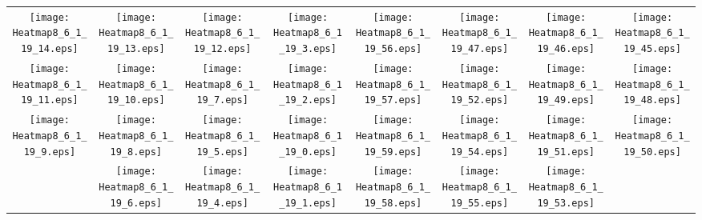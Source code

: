 \documentclass{standalone}
\begin{document}
\begin{tabular}{ *8{c} }
\texttt{[image: Heatmap8\_6\_1\_19\_14.eps]} & \texttt{[image: Heatmap8\_6\_1\_19\_13.eps]} & \texttt{[image: Heatmap8\_6\_1\_19\_12.eps]} & \texttt{[image: Heatmap8\_6\_1\_19\_3.eps]} & \texttt{[image: Heatmap8\_6\_1\_19\_56.eps]} & \texttt{[image: Heatmap8\_6\_1\_19\_47.eps]} & \texttt{[image: Heatmap8\_6\_1\_19\_46.eps]} & \texttt{[image: Heatmap8\_6\_1\_19\_45.eps]} \\
\texttt{[image: Heatmap8\_6\_1\_19\_11.eps]} & \texttt{[image: Heatmap8\_6\_1\_19\_10.eps]} & \texttt{[image: Heatmap8\_6\_1\_19\_7.eps]} & \texttt{[image: Heatmap8\_6\_1\_19\_2.eps]} & \texttt{[image: Heatmap8\_6\_1\_19\_57.eps]} & \texttt{[image: Heatmap8\_6\_1\_19\_52.eps]} & \texttt{[image: Heatmap8\_6\_1\_19\_49.eps]} & \texttt{[image: Heatmap8\_6\_1\_19\_48.eps]} \\
\texttt{[image: Heatmap8\_6\_1\_19\_9.eps]} & \texttt{[image: Heatmap8\_6\_1\_19\_8.eps]} & \texttt{[image: Heatmap8\_6\_1\_19\_5.eps]} & \texttt{[image: Heatmap8\_6\_1\_19\_0.eps]} & \texttt{[image: Heatmap8\_6\_1\_19\_59.eps]} & \texttt{[image: Heatmap8\_6\_1\_19\_54.eps]} & \texttt{[image: Heatmap8\_6\_1\_19\_51.eps]} & \texttt{[image: Heatmap8\_6\_1\_19\_50.eps]} \\
 & \texttt{[image: Heatmap8\_6\_1\_19\_6.eps]} & \texttt{[image: Heatmap8\_6\_1\_19\_4.eps]} & \texttt{[image: Heatmap8\_6\_1\_19\_1.eps]} & \texttt{[image: Heatmap8\_6\_1\_19\_58.eps]} & \texttt{[image: Heatmap8\_6\_1\_19\_55.eps]} & \texttt{[image: Heatmap8\_6\_1\_19\_53.eps]} &  
\end{tabular}
\end{document}
